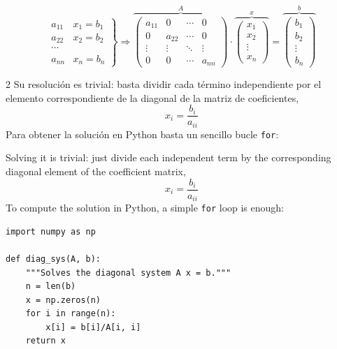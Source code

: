 \begin{equation*}
\left. \begin{aligned}
a_{11}&x_1=b_1\\
a_{22}&x_2=b_2\\
\cdots & \\
a_{nn}&x_n=b_n
\end{aligned}\right\} \Rightarrow	\overbrace{\begin{pmatrix}
a_{11}& 0& \cdots & 0\\
0& a_{22}& \cdots & 0\\
\vdots & \vdots & \ddots & \vdots\\
0& 0& \cdots & a_{nn}
\end{pmatrix}}^A \cdot \overbrace{\begin{pmatrix}
x_1\\
x_2\\
\vdots \\
x_n
\end{pmatrix}}^x=\overbrace{\begin{pmatrix}
b_1\\
b_2\\
\vdots \\
b_n
\end{pmatrix}}^b
\end{equation*}

\begin{paracol}{2}
Su resolución es trivial: basta dividir cada término independiente por el elemento correspondiente de la diagonal de la matriz de coeficientes,
\begin{equation*}
x_i=\frac{b_i}{a_{ii}}
\end{equation*}
Para obtener la solución en Python basta un sencillo bucle \texttt{for}:

\switchcolumn
Solving it is trivial: just divide each independent term by the corresponding diagonal element of the coefficient matrix,
\begin{equation*}
x_i=\frac{b_i}{a_{ii}}
\end{equation*}
To compute the solution in Python, a simple \texttt{for} loop is enough:
\end{paracol}

\begin{verbatim}
import numpy as np

def diag_sys(A, b):
    """Solves the diagonal system A x = b."""
    n = len(b)
    x = np.zeros(n)
    for i in range(n):
        x[i] = b[i]/A[i, i]
    return x
\end{verbatim}

